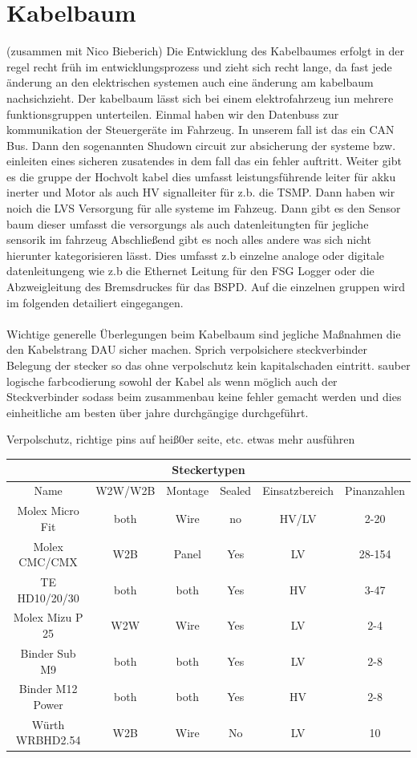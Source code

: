 \section{Kabelbaum} (zusammen mit Nico Bieberich)
Die Entwicklung des Kabelbaumes erfolgt in der regel recht früh im entwicklungsprozess und zieht sich recht lange, da fast jede änderung an den elektrischen systemen auch eine änderung am kabelbaum nachsichzieht. Der kabelbaum lässt sich bei einem elektrofahrzeug iun mehrere funktionsgruppen unterteilen. Einmal haben wir den Datenbuss zur kommunikation der Steuergeräte im Fahrzeug. In unserem fall ist das ein CAN Bus. Dann den sogenannten Shudown circuit zur absicherung der systeme bzw. einleiten eines sicheren zusatendes in dem fall das ein fehler auftritt. Weiter gibt es die gruppe der Hochvolt kabel dies umfasst leistungsführende leiter für akku inerter und Motor als auch HV signalleiter für z.b. die TSMP. Dann haben wir noich die LVS Versorgung für alle systeme im Fahzeug. Dann gibt es den Sensor baum dieser umfasst die versorgungs als auch datenleitungten für jegliche sensorik im fahrzeug  Abschließend gibt es noch alles andere was sich nicht hierunter kategorisieren lässt. Dies umfasst z.b einzelne analoge oder digitale datenleitungeng wie z.b die Ethernet Leitung für den FSG Logger oder die Abzweigleitung des Bremsdruckes für das BSPD. Auf die einzelnen gruppen wird im folgenden detailiert eingegangen.\\
\\
Wichtige generelle Überlegungen beim Kabelbaum sind jegliche Maßnahmen die den Kabelstrang DAU sicher machen. Sprich verpolsichere steckverbinder Belegung der stecker so das ohne verpolschutz kein kapitalschaden eintritt. sauber logische farbcodierung sowohl der Kabel als wenn möglich auch der Steckverbinder sodass beim zusammenbau keine fehler gemacht werden und dies einheitliche am besten über jahre durchgängige durchgeführt.

Verpolschutz, richtige pins auf heiß0er seite, etc. etwas mehr ausführen

\begin{tabular}{|c|c|c|c|c|c|}
	\hline
	\multicolumn{6}{|c|}{Steckertypen} \\
	\hline
	Name & W2W/W2B & Montage & Sealed & Einsatzbereich & Pinanzahlen \\
	\hline
	Molex Micro Fit & both & Wire & no & HV/LV & 2-20 \\
	\hline
	Molex CMC/CMX & W2B & Panel & Yes & LV  & 28-154 \\
	\hline
	TE HD10/20/30 & both & both & Yes & HV & 3-47 \\
	\hline
	Molex Mizu P 25 & W2W & Wire & Yes & LV & 2-4 \\
	\hline
	Binder Sub M9 & both & both & Yes & LV & 2-8 \\
	\hline
	Binder M12 Power & both & both & Yes & HV & 2-8 \\
	\hline
	Würth WRBHD2.54 & W2B & Wire & No & LV & 10 \\
	\hline
\end{tabular}


